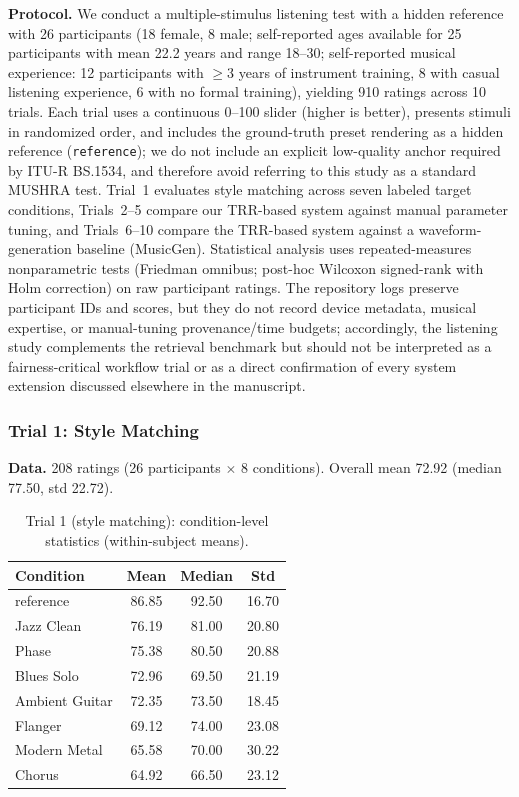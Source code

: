 \textbf{Protocol.} We conduct a multiple-stimulus listening test with a hidden reference with 26 participants (18 female, 8 male; self-reported ages available for 25 participants with mean 22.2 years and range 18--30; self-reported musical experience: 12 participants with $\geq$3 years of instrument training, 8 with casual listening experience, 6 with no formal training), yielding 910 ratings across 10 trials. Each trial uses a continuous 0--100 slider (higher is better), presents stimuli in randomized order, and includes the ground-truth preset rendering as a hidden reference (\texttt{reference}); we do not include an explicit low-quality anchor required by ITU-R BS.1534, and therefore avoid referring to this study as a standard MUSHRA test. Trial~1 evaluates style matching across seven labeled target conditions, Trials~2--5 compare our TRR-based system against manual parameter tuning, and Trials~6--10 compare the TRR-based system against a waveform-generation baseline (MusicGen). Statistical analysis uses repeated-measures nonparametric tests (Friedman omnibus; post-hoc Wilcoxon signed-rank with Holm correction) on raw participant ratings. The repository logs preserve participant IDs and scores, but they do not record device metadata, musical expertise, or manual-tuning provenance/time budgets; accordingly, the listening study complements the retrieval benchmark but should not be interpreted as a fairness-critical workflow trial or as a direct confirmation of every system extension discussed elsewhere in the manuscript.

\subsubsection{Trial 1: Style Matching}
\textbf{Data.} 208 ratings (26 participants $\times$ 8 conditions). Overall mean 72.92 (median 77.50, std 22.72).

\begin{table}[t]
	\centering
	\caption{Trial 1 (style matching): condition-level statistics (within-subject means).}
	\label{tab:mushra_trial1_stats}
	\begin{tabular}{lccc}
		\toprule
		\textbf{Condition} & \textbf{Mean} & \textbf{Median} & \textbf{Std} \\
		\midrule
		reference & 86.85 & 92.50 & 16.70 \\
		Jazz Clean & 76.19 & 81.00 & 20.80 \\
		Phase & 75.38 & 80.50 & 20.88 \\
		Blues Solo & 72.96 & 69.50 & 21.19 \\
		Ambient Guitar & 72.35 & 73.50 & 18.45 \\
		Flanger & 69.12 & 74.00 & 23.08 \\
		Modern Metal & 65.58 & 70.00 & 30.22 \\
		Chorus & 64.92 & 66.50 & 23.12 \\
		\bottomrule
	\end{tabular}
\end{table}

